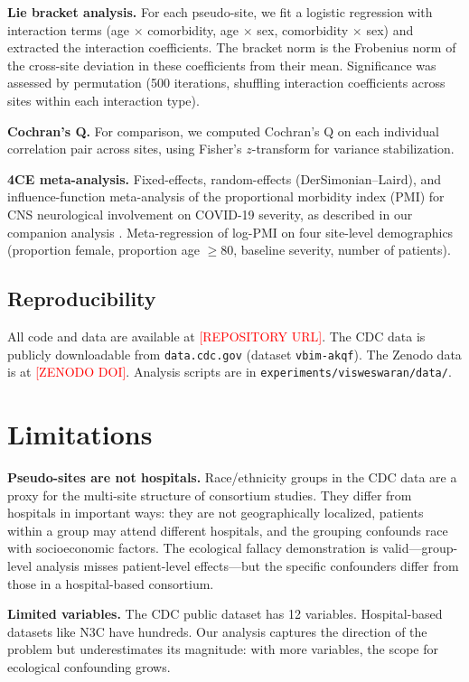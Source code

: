 \documentclass{article}
\begin{document}
\textbf{Lie bracket analysis.}  For each pseudo-site, we fit a logistic
regression with interaction terms (age $\times$ comorbidity, age $\times$ sex,
comorbidity $\times$ sex) and extracted the interaction coefficients.  The
bracket norm is the Frobenius norm of the cross-site deviation in these
coefficients from their mean.  Significance was assessed by permutation (500
iterations, shuffling interaction coefficients across sites within each
interaction type).

\textbf{Cochran's Q.}  For comparison, we computed Cochran's Q on each
individual correlation pair across sites, using Fisher's $z$-transform for
variance stabilization.

\textbf{4CE meta-analysis.}  Fixed-effects, random-effects (DerSimonian--Laird),
and influence-function meta-analysis of the proportional morbidity index (PMI)
for CNS neurological involvement on COVID-19 severity, as described in our
companion analysis \cite{four_ce_neuro2021}.  Meta-regression of log-PMI on
four site-level demographics (proportion female, proportion age $\geq 80$,
baseline severity, number of patients).


\subsection{Reproducibility}

All code and data are available at
\textcolor{red}{[REPOSITORY URL]}.  The CDC data is publicly downloadable from
\texttt{data.cdc.gov} (dataset \texttt{vbim-akqf}).  The Zenodo data is at
\textcolor{red}{[ZENODO DOI]}.  Analysis scripts are in
\texttt{experiments/visweswaran/data/}.


\section{Limitations}

\textbf{Pseudo-sites are not hospitals.}  Race/ethnicity groups in the CDC
data are a proxy for the multi-site structure of consortium studies.  They
differ from hospitals in important ways: they are not geographically
localized, patients within a group may attend different hospitals, and the
grouping confounds race with socioeconomic factors.  The ecological fallacy
demonstration is valid---group-level analysis misses patient-level
effects---but the specific confounders differ from those in a hospital-based
consortium.

\textbf{Limited variables.}  The CDC public dataset has 12 variables.
Hospital-based datasets like N3C have hundreds.  Our analysis captures the
direction of the problem but underestimates its magnitude: with more
variables, the scope for ecological confounding grows.
\end{document}
